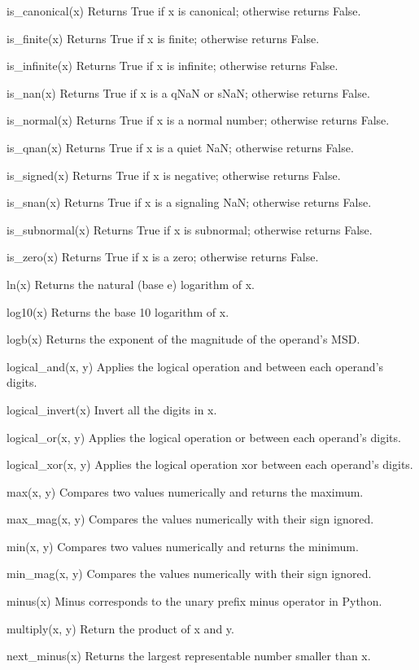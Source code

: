is\_canonical(x)
Returns True if x is canonical; otherwise returns False.

is\_finite(x)
Returns True if x is finite; otherwise returns False.

is\_infinite(x)
Returns True if x is infinite; otherwise returns False.

is\_nan(x)
Returns True if x is a qNaN or sNaN; otherwise returns False.

is\_normal(x)
Returns True if x is a normal number; otherwise returns False.

is\_qnan(x)
Returns True if x is a quiet NaN; otherwise returns False.

is\_signed(x)
Returns True if x is negative; otherwise returns False.

is\_snan(x)
Returns True if x is a signaling NaN; otherwise returns False.

is\_subnormal(x)
Returns True if x is subnormal; otherwise returns False.

is\_zero(x)
Returns True if x is a zero; otherwise returns False.

ln(x)
Returns the natural (base e) logarithm of x.

log10(x)
Returns the base 10 logarithm of x.

logb(x)
Returns the exponent of the magnitude of the operand’s MSD.

logical\_and(x, y)
Applies the logical operation and between each operand’s digits.

logical\_invert(x)
Invert all the digits in x.

logical\_or(x, y)
Applies the logical operation or between each operand’s digits.

logical\_xor(x, y)
Applies the logical operation xor between each operand’s digits.

max(x, y)
Compares two values numerically and returns the maximum.

max\_mag(x, y)
Compares the values numerically with their sign ignored.

min(x, y)
Compares two values numerically and returns the minimum.

min\_mag(x, y)
Compares the values numerically with their sign ignored.

minus(x)
Minus corresponds to the unary prefix minus operator in Python.

multiply(x, y)
Return the product of x and y.

next\_minus(x)
Returns the largest representable number smaller than x.

